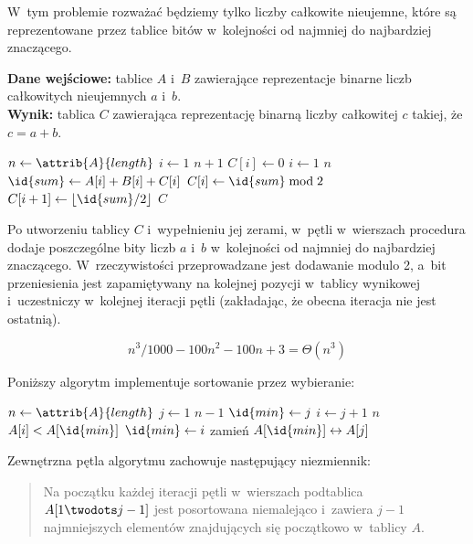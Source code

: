 \exercise %
W~tym problemie rozważać będziemy tylko liczby całkowite nieujemne, które są reprezentowane przez tablice bitów w~kolejności od najmniej do najbardziej znaczącego.

\bigskip
\noindent\textbf{Dane wejściowe:}  tablice $A$ i~$B$ zawierające reprezentacje binarne  liczb całkowitych nieujemnych $a$ i~$b$.\\
\textbf{Wynik:}  tablica $C$ zawierająca reprezentację binarną  liczby całkowitej $c$ takiej, że $c=a+b$.

\begin{codebox}
\li	$n\gets\attrib{A}{length}$
\li	\For $i\gets1$ \To $n+1$
\li		\Do $C[i]\gets0$
		\End
\li	\For $i\gets1$ \To $n$ \label{li:binary-add-for-begin}
\li		\Do
			$\id{sum}\gets A[i]+B[i]+C[i]$
\li			$C[i]\gets\id{sum}\bmod2$
\li			$C[i+1]\gets\lfloor\id{sum}/2\rfloor$
		\End \label{li:binary-add-for-end}
\li	\Return $C$
\end{codebox}

Po utworzeniu tablicy $C$ i~wypełnieniu jej zerami, w~pętli  w~wierszach \doubledash{\ref{li:binary-add-for-begin}}{\ref{li:binary-add-for-end}} procedura dodaje poszczególne bity liczb $a$ i~$b$ w~kolejności od najmniej do najbardziej znaczącego.
W~rzeczywistości przeprowadzane jest dodawanie modulo 2, a~bit przeniesienia jest zapamiętywany na kolejnej pozycji w~tablicy wynikowej i~uczestniczy w~kolejnej iteracji pętli (zakładając, że obecna iteracja nie jest ostatnią).


\exercise %
\[
	n^3\!/1000-100n^2-100n+3 = \Theta(n^3)
\]

\exercise %
Poniższy algorytm implementuje sortowanie przez wybieranie:
\begin{codebox}
\li	$n\gets\attrib{A}{length}$
\li	\For $j\gets1$ \To $n-1$ \label{li:selection-sort-for-begin}
\li		\Do
			$\id{min}\gets j$
\li			\For $i\gets j+1$ \To $n$
\li				\Do
					\If $A[i]<A[\id{min}]$
\li						\Then $\id{min}\gets i$
						\End
				\End
\li			zamień $A[\id{min}]\leftrightarrow A[j]$
		\End \label{li:selection-sort-for-end}
\end{codebox}
Zewnętrzna pętla algorytmu zachowuje następujący niezmiennik:
\begin{quote}
Na początku każdej iteracji pętli  w~wierszach \doubledash{\ref{li:selection-sort-for-begin}}{\ref{li:selection-sort-for-end}} podtablica $A[1\twodots j-1]$ jest posortowana niemalejąco i~zawiera $j-1$ najmniejszych elementów znajdujących się początkowo w~tablicy $A$.
\end{quote}

